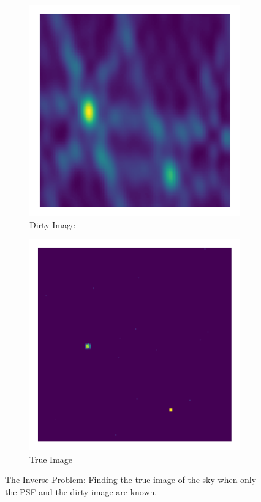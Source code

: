 \begin{figure}[h!]
\begin{subfigure}[b]{0.3\linewidth}
		\includegraphics[width=\linewidth, trim={18px 19px 18px 18px}, clip]{./chapters/01.intro/img/dirty_image.png}
		\caption{Dirty Image}
	\end{subfigure}
	\begin{subfigure}[b]{0.3\linewidth}
		\includegraphics[width=\linewidth, trim={18px 19px 18px 18px}, clip]{./chapters/01.intro/img/true_image.png}
		\caption{True Image}
	\end{subfigure}
	\caption{The Inverse Problem: Finding the true image of the sky when only the PSF and the dirty image are known.}
	\label{intro:inverse_problem}
\end{figure}

